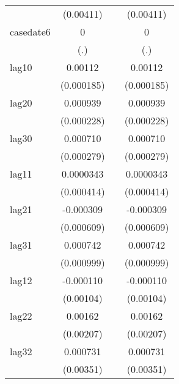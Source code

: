 {\begin{tabular}{l*{3}{c}}
            &   (0.00411)         &                     &   (0.00411)         \\
[1em]
casedate6   &           0         &                     &           0         \\
            &         (.)         &                     &         (.)         \\
[1em]
lag10       &     0.00112\sym{***}&                     &     0.00112\sym{***}\\
            &  (0.000185)         &                     &  (0.000185)         \\
[1em]
lag20       &    0.000939\sym{***}&                     &    0.000939\sym{***}\\
            &  (0.000228)         &                     &  (0.000228)         \\
[1em]
lag30       &    0.000710\sym{*}  &                     &    0.000710\sym{*}  \\
            &  (0.000279)         &                     &  (0.000279)         \\
[1em]
lag11       &   0.0000343         &                     &   0.0000343         \\
            &  (0.000414)         &                     &  (0.000414)         \\
[1em]
lag21       &   -0.000309         &                     &   -0.000309         \\
            &  (0.000609)         &                     &  (0.000609)         \\
[1em]
lag31       &    0.000742         &                     &    0.000742         \\
            &  (0.000999)         &                     &  (0.000999)         \\
[1em]
lag12       &   -0.000110         &                     &   -0.000110         \\
            &   (0.00104)         &                     &   (0.00104)         \\
[1em]
lag22       &     0.00162         &                     &     0.00162         \\
            &   (0.00207)         &                     &   (0.00207)         \\
[1em]
lag32       &    0.000731         &                     &    0.000731         \\
            &   (0.00351)         &                     &   (0.00351)         \\

\end{tabular}}
